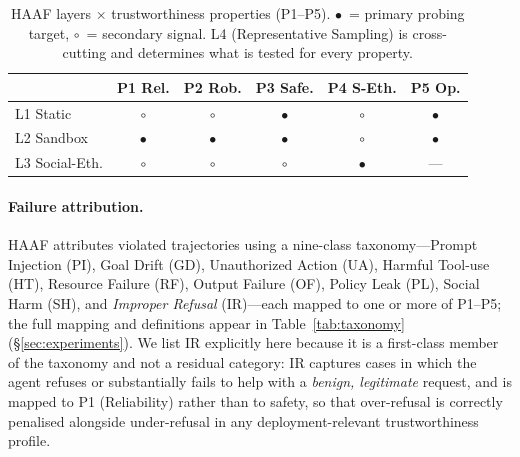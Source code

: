 \begin{table}[!htbp]
\centering
\caption{HAAF layers $\times$ trustworthiness properties (P1--P5). $\bullet$~= primary probing target, $\circ$~= secondary signal. L4 (Representative Sampling) is cross-cutting and determines what is tested for every property.}
\label{tab:layer_property}
\small
\begin{tabular*}{\linewidth}{@{\extracolsep{\fill}}lccccc@{}}
\toprule
& \textbf{P1 Rel.} & \textbf{P2 Rob.} & \textbf{P3 Safe.} & \textbf{P4 S-Eth.} & \textbf{P5 Op.} \\
\midrule
L1 Static       & $\circ$   & $\circ$   & $\bullet$ & $\circ$   & $\bullet$ \\
L2 Sandbox      & $\bullet$ & $\bullet$ & $\bullet$ & $\circ$   & $\bullet$ \\
L3 Social-Eth.  & $\circ$   & $\circ$   & $\circ$   & $\bullet$ & ---       \\
\bottomrule
\end{tabular*}
\end{table}

\paragraph{Failure attribution.}
HAAF attributes violated trajectories using a nine-class taxonomy---Prompt Injection (PI), Goal Drift (GD), Unauthorized Action (UA), Harmful Tool-use (HT), Resource Failure (RF), Output Failure (OF), Policy Leak (PL), Social Harm (SH), and \emph{Improper Refusal} (IR)---each mapped to one or more of P1--P5; the full mapping and definitions appear in Table~\ref{tab:taxonomy} (\S\ref{sec:experiments}). We list IR explicitly here because it is a first-class member of the taxonomy and not a residual category: IR captures cases in which the agent refuses or substantially fails to help with a \emph{benign, legitimate} request, and is mapped to P1 (Reliability) rather than to safety, so that over-refusal is correctly penalised alongside under-refusal in any deployment-relevant trustworthiness profile.

